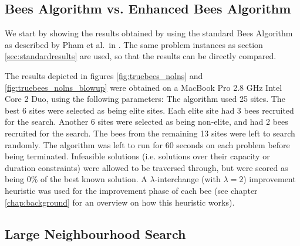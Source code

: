 \subsection{Bees Algorithm vs. Enhanced Bees Algorithm}
\label{subsec:bavebs}

We start by showing the results obtained by using the standard Bees Algorithm as described by Pham et al.\ in \cite{PGKORZ:2005}. The same problem instances as section \ref{sec:standardresults} are used, so that the results can be directly compared.



The results depicted in figures \ref{fig:truebees_nolns} and \ref{fig:truebees_nolns_blowup} were obtained on a MacBook Pro 2.8 GHz Intel Core 2 Duo, using the following parameters: The algorithm used 25 sites. The best 6 sites were selected as being elite sites. Each elite site had 3 bees recruited for the search. Another 6 sites were selected as being non-elite, and had 2 bees recruited for the search. The bees from the remaining 13 sites were left to search randomly. The algorithm was left to run for 60 seconds on each problem before being terminated. Infeasible solutions (i.e. solutions over their capacity or duration constraints) were allowed to be traversed through, but were scored as being 0\% of the best known solution. A $\lambda$-interchange (with $\lambda = 2$) improvement heuristic was used for the improvement phase of each bee (see chapter \ref{chap:background} for an overview on how this heuristic works).

\subsection{Large Neighbourhood Search}
\label{subsec:largeneighbourhoodsearch}

